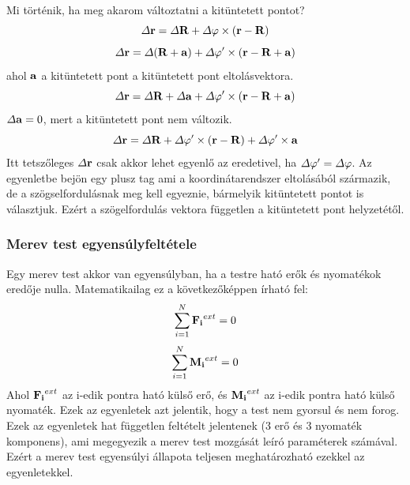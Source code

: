 \documentclass[../main.tex]{subfiles}
\begin{document}
Mi történik, ha meg akarom változtatni a kitüntetett pontot?
\begin{equation}
    \varDelta \bold{r} = \varDelta \bold{R} + \varDelta \bold{\varphi} \times (\bold{r} - \bold{R})
\end{equation}
\begin{equation}
    \varDelta \bold{r} = \varDelta (\bold{R} + \bold{a}) + \varDelta \bold{\varphi'} \times (\bold{r} - \bold{R} + \bold{a})
\end{equation}
ahol $\bold{a}$ a kitüntetett pont a kitüntetett pont eltolásvektora.
\begin{equation}
    \varDelta \bold{r} = \varDelta \bold{R} + \varDelta \bold{a} + \varDelta \bold{\varphi'} \times (\bold{r} - \bold{R} + \bold{a})
\end{equation}
$\varDelta \bold{a} = 0$, mert a kitüntetett pont nem változik.
\begin{equation}
    \varDelta \bold{r} = \varDelta \bold{R} + \varDelta \bold{\varphi'} \times (\bold{r} - \bold{R}) + \varDelta \bold{\varphi'} \times \bold{a}
\end{equation}
Itt tetszőleges $\varDelta \bold{r}$ csak akkor lehet egyenlő az eredetivel, ha $\varDelta \bold{\varphi'} = \varDelta \bold{\varphi}$. Az egyenletbe bejön egy plusz tag ami a koordinátarendszer eltolásából származik,
de a szögselfordulásnak meg kell egyeznie, bármelyik kitüntetett pontot is választjuk. Ezért a szögelfordulás vektora független a kitüntetett pont helyzetétől.

\subsubsection{Merev test egyensúlyfeltétele}
Egy merev test akkor van egyensúlyban, ha a testre ható erők és nyomatékok eredője nulla. Matematikailag ez a következőképpen írható fel:
\begin{equation}
    \sum_{i=1}^{N} \bold{F_i}^{ext} = 0
\end{equation}
\begin{equation}
    \sum_{i=1}^{N} \bold{M_i}^{ext} = 0
\end{equation}
Ahol $\bold{F_i}^{ext}$ az i-edik pontra ható külső erő, és $\bold{M_i}^{ext}$ az i-edik pontra ható külső nyomaték. Ezek az egyenletek azt jelentik, hogy a test nem gyorsul és nem forog.
Ezek az egyenletek hat független feltételt jelentenek (3 erő és 3 nyomaték komponens), ami megegyezik a merev test mozgását leíró paraméterek számával. Ezért a merev test egyensúlyi állapota teljesen meghatározható ezekkel az egyenletekkel.
\end{document}
